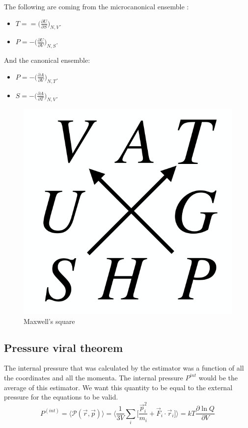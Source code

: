 The following are coming from the microcanonical ensemble :
	\begin{multicols}{2}
		\begin{itemize}
			\item $T = =\biggl(\frac{\partial U}{\partial S}\biggr)_{N, V}$.
			\item $P = - \biggl(\frac{\partial U}{\partial V}\biggr)_{N, S}$.
		\end{itemize}
	\end{multicols}

And the canonical ensemble:
	\begin{multicols}{2}
		\begin{itemize}
			\item $P = -\biggl(\frac{\partial A}{\partial V}\biggr)_{N, T}$.
			\item $S = - \biggl(\frac{\partial A}{\partial T}\biggr)_{N, V}$.
		\end{itemize}
	\end{multicols}

	\begin{figure}[H]
		\includegraphics[scale = 0.1]{maxwell_square}
		\centering
		\caption{Maxwell's square}
	\end{figure}


	\subsection{Pressure viral theorem}
	The internal pressure that was calculated by the estimator was a function of all the coordinates and all the momenta. The internal pressure $P^{int}$ would be the average of this estimator. We want this quantity to be equal to the external pressure for the equations to be valid.
	$$P^{(int)} =\langle\mathcal{P}(\vec{r}, \vec{p})\rangle = \biggl\langle\frac{1}{3V}\sum\limits_i\biggl[\frac{\vec{p}_i^2}{m_i} + \vec{F}_i\cdot\vec{r}_i\biggr]\biggr\rangle = kT\frac{\partial\ln Q}{\partial V}$$

